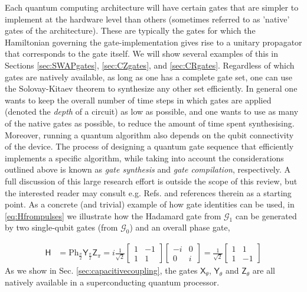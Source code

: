 \documentclass[aip,apr,twocolumn,showpacs,superscriptaddress,groupedaddress,nofootinbib,reprint]{revtex4-1}  %
\newcommand{\X}[1]{\textsf{X}_{#1}}
\newcommand{\Y}[1]{\textsf{Y}_{#1}}
\newcommand{\Z}[1]{\textsf{Z}_{#1}}
\renewcommand{\H}{\textsf{H}}
\begin{document}
Each quantum computing architecture will have certain gates that are simpler to implement at the hardware level than others (sometimes referred to as 'native' gates of the architecture). These are typically the gates for which the Hamiltonian governing the gate-implementation gives rise to a unitary propagator that corresponds to the gate itself. We will show several examples of this in Sections \ref{sec:SWAPgates}, \ref{sec:CZgates}, and \ref{sec:CRgates}. Regardless of which gates are natively available, as long as one has a complete gate set, one can use the Solovay-Kitaev theorem to synthesize any other set efficiently. In general one wants to keep the overall number of time steps in which gates are applied (denoted the \emph{depth} of a circuit) as low as possible, and one wants to use as many of the native gates as possible, to reduce the amount of time spent synthesising. Moreover, running a quantum algorithm also depends on the qubit connectivity of the device. The process of designing a quantum gate sequence that efficiently implements a specific algorithm, while taking into account the considerations outlined above is known as \emph{gate synthesis} and \emph{gate compilation}, respectively. A full discussion of this large research effort is outside the scope of this review, but the interested reader may consult e.g. Refs.  and references therein as a starting point. As a concrete (and trivial) example of how gate identities can be used, in \cref{eq:Hfrompulses} we illustrate how the Hadamard gate from $\mathcal G_1$ can be generated by two single-qubit gates (from $\mathcal G_0$) and an overall phase gate,

\begin{align}
\H &= \text{Ph}_{\frac{\pi}{2}}\Y{\frac{\pi}{2}} \Z{\pi} = i\frac{1}{\sqrt{2}} \begin{bmatrix}
1 & -1\\
1 & 1
\end{bmatrix}
\begin{bmatrix}
-i & 0\\
0 & i
\end{bmatrix}=
\frac{1}{\sqrt{2}}
\begin{bmatrix}
1 & 1\\
1 & -1
\end{bmatrix}
\label{eq:Hfrompulses}
\end{align}
As we show in Sec. \ref{sec:capacitivecoupling}, the gates $\X{\theta}$, $\Y{\theta}$ and $\Z{\theta}$ are all natively available in a superconducting quantum processor.
\end{document}
